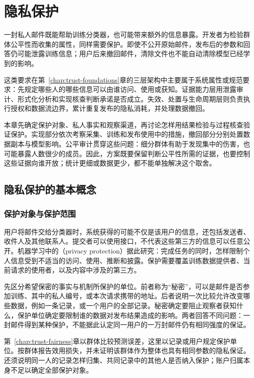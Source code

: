 \chapter{隐私保护}
\label{chap:trust-privacy}

一封私人邮件既能帮助训练分类器，也可能带来额外的信息暴露。开发者为检验群体公平性而收集的属性，同样需要保护。即使不公开原始邮件，发布后的参数和回答仍可能泄露训练信息；用户后来撤回邮件，清除文件也不能自动清除模型已经学到的影响。

这类要求在第~\ref{chap:trust-foundations}章的三层架构中主要属于系统属性或规范要求：先规定哪些人的哪些信息可以由谁访问、使用或获知。证据能力层用泄露审计、形式化分析和实现核查判断承诺是否成立。失效、处置与生命周期层则负责执行授权和数据流边界，累计重复发布的隐私消耗，并处理数据撤回。

本章先确定保护对象、私人事实和观察渠道，再讨论怎样用结果检验与过程核查验证保护。实现部分依次考察采集、训练和发布使用中的措施，撤回部分分别处置数据副本与模型影响。公平审计贯穿这些问题：细分群体有助于发现集中的伤害，也可能暴露人数很少的成员。因此，方案既要保留判断公平性所需的证据，也要控制这些证据向谁开放；统计更细或数据更少，都不能单独解决这个取舍。

\section{隐私保护的基本概念}
\label{sec:privacy-concepts}

\subsection{保护对象与保护范围}
\label{sec:privacy-subjects}

用户将邮件交给分类器时，系统获得的可能不仅是该用户的信息，还包括发送者、收件人及其他联系人。提交者可以使用接口，不代表这些第三方的信息可以任意公开。机器学习中的（privacy protection）据此研究：完成任务的同时，怎样限制个人信息受到不适当的访问、使用、推断和披露。保护需要覆盖训练数据提供者、当前请求的使用者，以及内容中涉及的第三方。

先区分希望保密的事实与机制所保护的单位。前者称为“秘密”，可以是邮件是否参加训练、其中的私人编号，或本次请求携带的地址。后者说明一次比较允许改变哪些数据，例如一条记录，或一个用户的全部记录。秘密确定要阻止观察者获知什么，保护单位确定要限制谁的数据对发布结果造成的影响。两者回答不同问题：一封邮件得到某种保护，不能据此认定同一用户的一万封邮件仍有相同强度的保证。

第~\ref{chap:trust-fairness}章以群体比较预测误差，这里以记录或用户规定保护单位。按群体报告效用损失，并未证明该群体作为整体也具有相同参数的隐私保证。还须说明同一人的记录怎样归集、共同记录中的其他人是否纳入保护；账户归属本身不足以确定全部保护对象。

